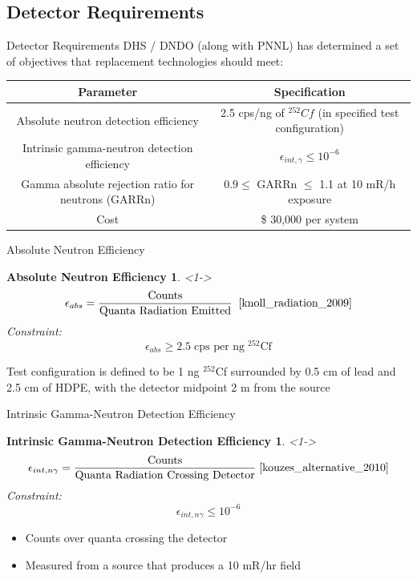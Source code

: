 \subsection{Detector Requirements}
\begin{frame}{Detector Requirements}
DHS / DNDO (along with PNNL) has determined a set of objectives that replacement technologies should meet:
\begin{table}
	\tiny
	\begin{tabular}{c c }
	Parameter & Specification \\
	\hline
	\hline
	Absolute neutron detection efficiency & 2.5 cps/ng of ${}^{252}Cf$ (in specified test configuration) \\
	Intrinsic gamma-neutron detection efficiency & $ \epsilon_{int,\gamma}\leq 10^{-6}$ \\
	Gamma absolute rejection ratio for neutrons (GARRn) & $ 0.9 \leq \text{ GARRn }\leq$ 1.1 at 10 mR/h exposure \\
	Cost &  \$ 30,000 per system \\
	\hline
	\end{tabular}
\end{table}
\end{frame}

\begin{frame}{Absolute Neutron Efficiency}
\newtheorem{thm1}{Absolute Neutron Efficiency}
\begin{thm1}<1->
$$\epsilon_{abs} = \frac{\text{Counts}}{\text{Quanta Radiation Emitted}}\; \; \protect \cite{knoll_radiation_2009} $$
Constraint:
$$\epsilon_{abs} \geq 2.5\; \text{cps per ng}\; {}^{252}\text{Cf}$$
\end{thm1}
Test configuration is defined to be 1 ng ${}^{252}$Cf surrounded by 0.5 cm of lead and 2.5 cm of HDPE, with the detector midpoint 2 m from the source \cite{kouzes_alternative_2010}
\end{frame}


\begin{frame}{Intrinsic Gamma-Neutron Detection Efficiency}
\newtheorem{thm2}{Intrinsic Gamma-Neutron Detection Efficiency}
\begin{thm2}<1->
$$\epsilon_{int,n \gamma} = \frac{\text{Counts}}{\text{Quanta Radiation Crossing Detector}} \; \protect \cite{kouzes_alternative_2010} $$
Constraint:
$$ \epsilon_{int,n \gamma} \leq 10^{-6} $$
\end{thm2}
\begin{itemize}
	\item Counts over quanta crossing the detector
	\item Measured from a source that produces a 10 mR/hr field
\end{itemize}
\end{frame}

